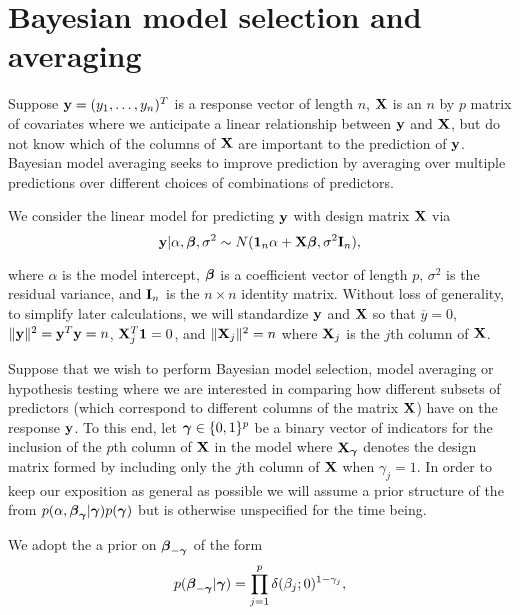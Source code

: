 \documentclass{article}[12pt]
\begin{document}
 



 
 

\section{Bayesian model selection and averaging}
\label{sec:bma}



Suppose ${\bf y} = (y_1,\ldots,y_n)^T$ is a response vector of length $n$, ${\bf X}$ is an $n$ by $p$ matrix 
of covariates where we anticipate a linear relationship between ${\bf y}$ and ${\bf X}$, but do not know
which of the columns of ${\bf X}$ are important to the prediction of ${\bf y}$.
Bayesian model averaging seeks to improve prediction by averaging over multiple
predictions over different choices of combinations of predictors.

We consider the linear model for predicting ${\bf y}$ with design matrix ${\bf X}$ via
\begin{equation}
\label{eq:linearModel}
{\bf y} | \alpha, {\boldsymbol \beta}, \sigma^2 \sim N({\bf 1}_n\alpha + {\bf X} {\boldsymbol \beta}, \sigma^2 {\bf I}_n),
\end{equation} 


\noindent where $\alpha$ is the model intercept, ${\boldsymbol \beta}$ is a coefficient vector of length $p$, 
$\sigma^2$ is the residual variance, and ${\bf I}_n$ is the $n \times n$ identity matrix. 
Without loss of generality, to simplify later calculations, we will standardize ${\bf y}$ and ${\bf X}$ 
so that $\overline{y} = 0$, 
$\|{\bf y}\|^2 = {\bf y}^T{\bf y} = n$, ${\bf X}_j^T{\bf 1} = 0$,  and $\|{\bf X}_j\|^2 = n$ where ${\bf X}_j$ is the $j$th 
column of ${\bf X}$. 


Suppose that we wish to perform Bayesian model selection, model averaging or hypothesis 
testing where we are interested in comparing how different subsets of predictors 
(which correspond to different columns of the matrix ${\bf X}$) have on the response ${\bf y}$. To this end, 
let ${\boldsymbol \gamma} \in \{0, 1\}^p$ be a binary vector of indicators for the inclusion of the $p$th column 
of ${\bf X}$ in the model where ${\bf X}_{\boldsymbol \gamma}$ denotes the design matrix formed by including only the 
$j$th column of ${\bf X}$ when $\gamma_j = 1$. 
In order to keep our exposition as general as possible we will assume a prior structure of
the from 
$p(\alpha,{\boldsymbol \beta}_{{\boldsymbol \gamma}}|{\boldsymbol \gamma})p({\boldsymbol \gamma})$ but is otherwise unspecified for
the time being. 

We adopt the a prior on ${\boldsymbol \beta}_{-{\boldsymbol \gamma}}$  
of the form
\begin{equation}
\label{eq:spikeAndSlab}
\displaystyle p({\boldsymbol \beta}_{-{\boldsymbol \gamma}}|{\boldsymbol \gamma}) = \prod_{j=1}^p \delta(\beta_j;0)^{1-\gamma_j},
\end{equation} 
\end{document}
